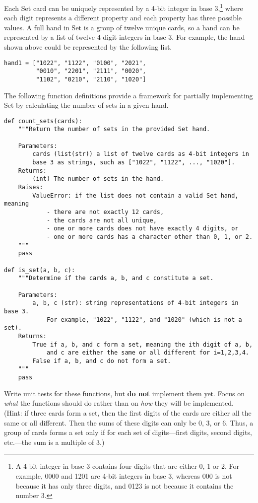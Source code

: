 \begin{problem}
Each Set card can be uniquely represented by a 4-bit integer in base 3,\footnote{A 4-bit integer in base 3 contains four digits that are either 0, 1 or 2. For example, 0000 and 1201 are 4-bit integers in base 3, whereas 000 is not because it has only three digits, and 0123 is not because it contains the number 3.} where each digit represents a different property and each property has three possible values.
A full hand in Set is a group of twelve unique cards, so a hand can be represented by a list of twelve 4-digit integers in base 3.
For example, the hand shown above could be represented by the following list.

\begin{lstlisting}
hand1 = ["1022", "1122", "0100", "2021",
         "0010", "2201", "2111", "0020",
         "1102", "0210", "2110", "1020"]
\end{lstlisting}

The following function definitions provide a framework for partially implementing Set by calculating the number of sets in a given hand. %

\newpage

\begin{lstlisting}
def count_sets(cards):
    """Return the number of sets in the provided Set hand.

    Parameters:
        cards (list(str)) a list of twelve cards as 4-bit integers in
        base 3 as strings, such as ["1022", "1122", ..., "1020"].
    Returns:
        (int) The number of sets in the hand.
    Raises:
        ValueError: if the list does not contain a valid Set hand, meaning
            - there are not exactly 12 cards,
            - the cards are not all unique,
            - one or more cards does not have exactly 4 digits, or
            - one or more cards has a character other than 0, 1, or 2.
    """
    pass

def is_set(a, b, c):
    """Determine if the cards a, b, and c constitute a set.

    Parameters:
        a, b, c (str): string representations of 4-bit integers in base 3.
            For example, "1022", "1122", and "1020" (which is not a set).
    Returns:
        True if a, b, and c form a set, meaning the ith digit of a, b,
            and c are either the same or all different for i=1,2,3,4.
        False if a, b, and c do not form a set.
    """
    pass
\end{lstlisting}

Write unit tests for these functions, but \textbf{do not} implement them yet.
Focus on \emph{what} the functions should do rather than on \emph{how} they will be implemented.
\\ (Hint: if three cards form a set, then the first digits of the cards are either all the same or all different.
Then the sums of these digits can only be 0, 3, or 6.
Thus, a group of cards forms a set only if for each set of digits---first digits, second digits, etc.---the sum is a multiple of 3.)
\label{prob:tdd_tests}
\end{problem}

